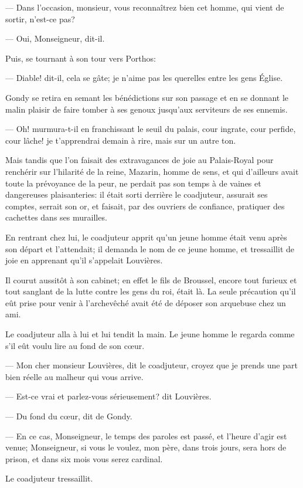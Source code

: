 — Dans l'occasion, monsieur, vous reconnaîtrez bien cet homme, qui vient de sortir, n'est-ce pas?

— Oui, Monseigneur, dit-il.

Puis, se tournant à son tour vers Porthos:

— Diable! dit-il, cela se gâte; je n'aime pas les querelles entre les gens Église.

Gondy se retira en semant les bénédictions sur son passage et en se donnant le malin plaisir de faire tomber à ses genoux jusqu'aux serviteurs de ses ennemis.

— Oh! murmura-t-il en franchissant le seuil du palais, cour ingrate, cour perfide, cour lâche! je t'apprendrai demain à rire, mais sur un autre ton.

Mais tandis que l'on faisait des extravagances de joie au Palais-Royal pour renchérir sur l'hilarité de la reine, Mazarin, homme de sens, et qui d'ailleurs avait toute la prévoyance de la peur, ne perdait pas son temps à de vaines et dangereuses plaisanteries: il était sorti derrière le coadjuteur, assurait ses comptes, serrait son or, et faisait, par des ouvriers de confiance, pratiquer des cachettes dans ses murailles.

En rentrant chez lui, le coadjuteur apprit qu'un jeune homme était venu après son départ et l'attendait; il demanda le nom de ce jeune homme, et tressaillit de joie en apprenant qu'il s'appelait Louvières.

Il courut aussitôt à son cabinet; en effet le fils de Broussel, encore tout furieux et tout sanglant de la lutte contre les gens du roi, était là. La seule précaution qu'il eût prise pour venir à l'archevêché avait été de déposer son arquebuse chez un ami.

Le coadjuteur alla à lui et lui tendit la main. Le jeune homme le regarda comme s'il eût voulu lire au fond de son cœur.

— Mon cher monsieur Louvières, dit le coadjuteur, croyez que je prends une part bien réelle au malheur qui vous arrive.

— Est-ce vrai et parlez-vous sérieusement? dit Louvières.

— Du fond du cœur, dit de Gondy.

— En ce cas, Monseigneur, le temps des paroles est passé, et l'heure d'agir est venue; Monseigneur, si vous le voulez, mon père, dans trois jours, sera hors de prison, et dans six mois vous serez cardinal.

Le coadjuteur tressaillit.

